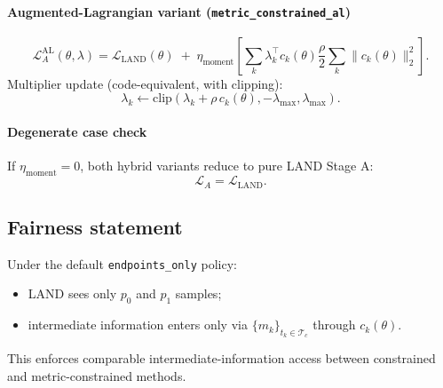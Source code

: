 \documentclass[11pt]{article}
\begin{document}
\paragraph{Augmented-Lagrangian variant (\texttt{metric\_constrained\_al})}
\[
\mathcal{L}_{A}^{\mathrm{AL}}(\theta,\lambda)
=
\mathcal{L}_{\mathrm{LAND}}(\theta)
\;+\;
\eta_{\mathrm{moment}}
\left[
\sum_k \lambda_k^\top c_k(\theta)
\frac{\rho}{2}\sum_k \|c_k(\theta)\|_2^2
\right].
\]
Multiplier update (code-equivalent, with clipping):
\[
\lambda_k\leftarrow
\mathrm{clip}\!\left(\lambda_k+\rho\,c_k(\theta),-\lambda_{\max},\lambda_{\max}\right).
\]

\paragraph{Degenerate case check}
If $\eta_{\mathrm{moment}}=0$, both hybrid variants reduce to pure LAND Stage A:
\[
\mathcal{L}_{A}=\mathcal{L}_{\mathrm{LAND}}.
\]

\subsection*{Fairness statement}
Under the default \texttt{endpoints\_only} policy:
\begin{itemize}
    \item LAND sees only $p_0$ and $p_1$ samples;
    \item intermediate information enters only via $\{m_k\}_{t_k\in\mathcal{T}_c}$ through $c_k(\theta)$.
\end{itemize}
This enforces comparable intermediate-information access between constrained and metric-constrained methods.
\end{document}
